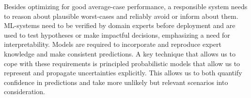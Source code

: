 Besides optimizing for good average-case performance, a responsible system needs to reason about plausible worst-cases and reliably avoid or inform about them.
ML-systems need to be verified by domain experts before deployment and are used to test hypotheses or make impactful decisions, emphasizing a need for interpretability.
Models are required to incorporate and reproduce expert knowledge and make consistent predictions.
A key technique that allows us to cope with these requirements is principled probabilistic models that allow us to represent and propagate uncertainties explicitly.
This allows us to both quantify confidence in predictions and take more unlikely but relevant scenarios into consideration.




